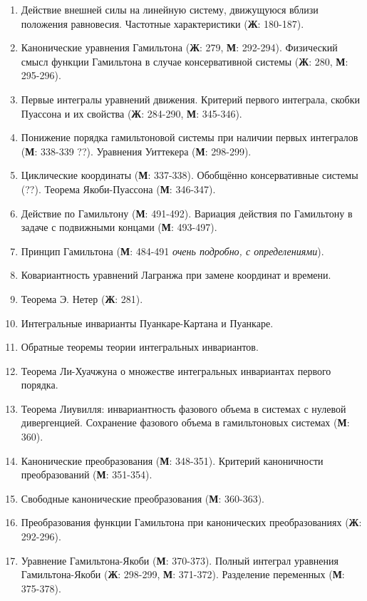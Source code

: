 \documentclass[a4paper,12pt]{article}
\newcommand{\jur}[1]{\textbf{Ж}: #1}
\newcommand{\mar}[1]{\textbf{М}: #1}
\begin{document}
\begin{enumerate}
	\item Действие внешней силы на линейную систему, движущуюся вблизи положения равновесия. Частотные характеристики (\jur{180-187}).
	
	\item Канонические  уравнения  Гамильтона (\jur{279}, \mar{292-294}).  Физический смысл функции Гамильтона в случае консервативной системы (\jur{280}, \mar{295-296}).
	
	\item Первые интегралы уравнений движения. Критерий первого интеграла, скобки Пуассона и их свойства (\jur{284-290}, \mar{345-346}).
	
	
	\item Понижение порядка гамильтоновой системы при наличии первых интегралов (\mar{338-339} ??). Уравнения Уиттекера (\mar{298-299}).
	
	\item Циклические координаты (\mar{337-338}). Обобщённо консервативные системы (??). Теорема Якоби-Пуассона (\mar{346-347}).
	
	\item Действие по Гамильтону (\mar{491-492}). Вариация  действия по Гамильтону в задаче с подвижными концами (\mar{493-497}).
	
	
	\item Принцип Гамильтона (\mar{484-491} \textit{очень подробно, с определениями}).
	
	\item Ковариантность уравнений Лагранжа при замене координат и времени.
	
	\item Теорема Э. Нетер (\jur{281}).
	
	\item Интегральные  инварианты Пуанкаре-Картана и Пуанкаре.
	
	\item Обратные  теоремы  теории  интегральных  инвариантов.
	
	\item Теорема Ли-Хуачжуна о множестве интегральных инвариантах первого порядка.
	
	\item Теорема Лиувилля: инвариантность фазового объема в системах с нулевой дивергенцией. Сохранение фазового объема в гамильтоновых системах (\mar{360}).
	
	\item Канонические преобразования (\mar{348-351}). Критерий каноничности преобразований (\mar{351-354}).
	
	\item Свободные канонические преобразования (\mar{360-363}).
	
	\item Преобразования функции Гамильтона при канонических преобразованиях (\jur{292-296}).
	
	\item Уравнение Гамильтона-Якоби (\mar{370-373}). Полный интеграл уравнения Гамильтона-Якоби (\jur{298-299}, \mar{371-372}). Разделение переменных (\mar{375-378}).
\end{enumerate}
\end{document}
